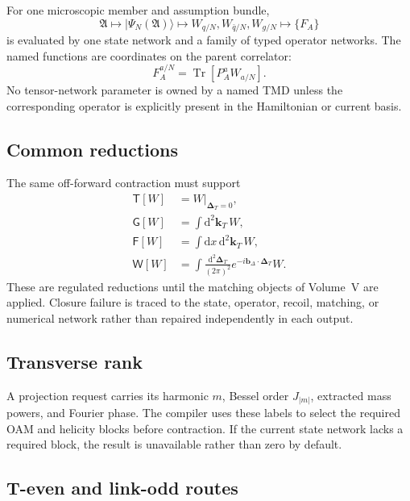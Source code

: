 \documentclass[11pt]{article}
\newcommand{\kT}{\bm{k}_{T}}
\newcommand{\DT}{\bm{\Delta}_{T}}
\newcommand{\bD}{\bm{b}_{\Delta}}
\newcommand{\dd}{\mathrm{d}}
\newcommand{\Tr}{\operatorname{Tr}}
\newcommand{\Aset}{\mathfrak A}
\begin{document}
For one microscopic member and assumption bundle,
\begin{equation}
 \Aset
 \longmapsto
 |\Psi_N(\Aset)\rangle
 \longmapsto
 W_{q/N},W_{\bar q/N},W_{g/N}
 \longmapsto
 \{F_A\}
\label{eq:tn-parent-chain}
\end{equation}
is evaluated by one state network and a family of typed operator networks.
The named functions are coordinates on the parent correlator:
\begin{equation}
 F_A^{a/N}
 =
 \Tr\left[
 P_A^{a}
 W_{a/N}
 \right].
\label{eq:named-tmd-projection}
\end{equation}
No tensor-network parameter is owned by a named TMD unless the corresponding
operator is explicitly present in the Hamiltonian or current basis.

\subsection{Common reductions}

The same off-forward contraction must support
\begin{equation}
 \begin{aligned}
 \mathsf T[W]&=W\big|_{\DT=0},\\
 \mathsf G[W]&=\int\dd^2\kT\,W,\\
 \mathsf F[W]&=\int\dd x\,\dd^2\kT\,W,\\
 \mathsf W[W]&=\int\frac{\dd^2\DT}{(2\pi)^2}
 e^{-i\bD\cdot\DT}W.
 \end{aligned}
\label{eq:common-reductions-tn}
\end{equation}
These are regulated reductions until the matching objects of Volume~V are
applied.  Closure failure is traced to the state, operator, recoil, matching,
or numerical network rather than repaired independently in each output.

\subsection{Transverse rank}

A projection request carries its harmonic \(m\), Bessel order \(J_{|m|}\),
extracted mass powers, and Fourier phase.  The compiler uses these labels to
select the required OAM and helicity blocks before contraction.  If the current
state network lacks a required block, the result is unavailable rather than
zero by default.

\subsection{T-even and link-odd routes}
\end{document}
